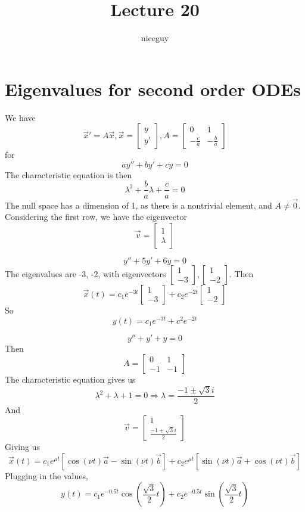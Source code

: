 \documentclass[12pt]{article}
\author{niceguy}
\title{Lecture 20}
\begin{document}
\maketitle

\section{Eigenvalues for second order ODEs}
We have
$$\vec{x}' = A\vec{x}, \vec{x} = \begin{bmatrix} y \\ y'\end{bmatrix}, A = \begin{bmatrix} 0 & 1 \\ -\frac{c}{a} & -\frac{b}{a}\end{bmatrix}$$
for
$$ay'' + by' + cy = 0$$
The characteristic equation is then
$$\lambda^2 + \frac{b}{a}\lambda + \frac{c}{a} = 0$$
The null space has a dimension of 1, as there is a nontrivial element, and $A \neq \vec{0}$. Considering the first row, we have the eigenvector
$$\vec{v} = \begin{bmatrix} 1 \\ \lambda\end{bmatrix}$$ 

\begin{ex}
	$$y'' + 5y' + 6y = 0$$
	The eigenvalues are -3, -2, with eigenvectors $\begin{bmatrix} 1 \\ -3\end{bmatrix}, \begin{bmatrix} 1 \\ -2\end{bmatrix}$.
	Then
	$$\vec{x}(t) = c_1e^{-3t}\begin{bmatrix} 1 \\ -3\end{bmatrix} + c_2e^{-2t} \begin{bmatrix} 1 \\ -2\end{bmatrix}$$
	So
	$$y(t) = c_1e^{-3t} + c^2e^{-2t}$$
\end{ex}

\begin{ex}
	$$y'' + y' + y = 0$$
	Then
	$$A = \begin{bmatrix} 0 & 1 \\ -1 & -1\end{bmatrix}$$
	The characteristic equation gives us
	$$\lambda^2 + \lambda + 1 = 0 \Rightarrow \lambda = \frac{-1\pm\sqrt{3}i}{2}$$
	And
	$$\vec{v} = \begin{bmatrix} 1 \\ \frac{-1+\sqrt{3}i}{2}\end{bmatrix}$$
	Giving us
	$$\vec{x}(t) = c_1e^{\mu t}[\cos(\nu t)\vec{a} - \sin(\nu t)\vec{b}] + c_2e^{\mu t}[\sin(\nu t)\vec{a} + \cos(\nu t)\vec{b}]$$
	Plugging in the values,
	$$y(t) = c_1e^{-0.5t}\cos\left(\frac{\sqrt{3}}{2}t\right) + c_2e^{-0.5t}\sin\left(\frac{\sqrt{3}}{2}t\right)$$
\end{ex}
\end{document}
